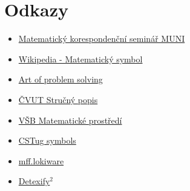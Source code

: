 \documentclass[main.tex]{subfiles}
\begin{document}
\section*{Odkazy}
\begin{itemize}
  \item \href{http://mks.mff.cuni.cz/info/tex/psani.php}{Matematický korespondenční seminář MUNI}
  \item \href{http://cs.wikipedia.org/wiki/Matematický_symbol}{Wikipedia - Matematický symbol}
  \item \href{http://www.artofproblemsolving.com/Wiki/index.php/LaTeX:Symbols}{Art of problem solving}
  \item \href{http://mat.fsv.cvut.cz/konickova/navody/ltxstruc.pdf}{ČVUT Stručný popis}
  \item \href{http://www.cs.vsb.cz/benes/vyuka/latex/math.htm}{VŠB Matematické prostředí}
  \item \href{http://ftp.cstug.cz/pub/tex/CTAN/info/symbols/comprehensive/symbols-letter.pdf}{CSTug symbols}
  \item \href{http://mff.lokiware.info/LaTeX}{mff.lokiware}
  \item \href{http://detexify.kirelabs.org/classify.html}{Detexify$^2$}
\end{itemize}
\end{document}
